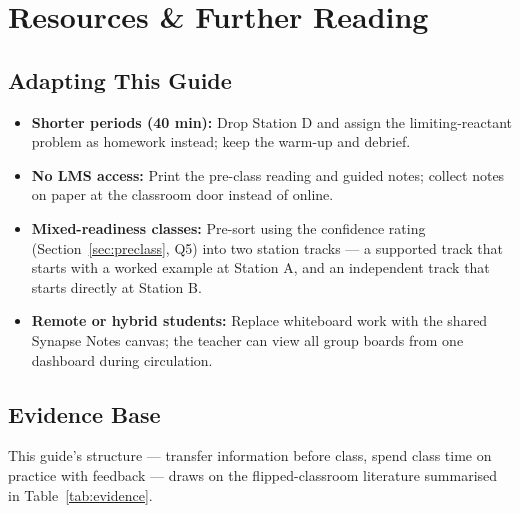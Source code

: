 \section{Resources \& Further Reading}

\subsection*{Adapting This Guide}

\begin{itemize}[label=\textbullet]
  \item \textbf{Shorter periods (40 min):} Drop Station D and assign the limiting-reactant problem as homework instead; keep the warm-up and debrief.
  \item \textbf{No LMS access:} Print the pre-class reading and guided notes; collect notes on paper at the classroom door instead of online.
  \item \textbf{Mixed-readiness classes:} Pre-sort using the confidence rating (Section~\ref{sec:preclass}, Q5) into two station tracks --- a supported track that starts with a worked example at Station A, and an independent track that starts directly at Station B.
  \item \textbf{Remote or hybrid students:} Replace whiteboard work with the shared Synapse Notes canvas; the teacher can view all group boards from one dashboard during circulation.
\end{itemize}

\subsection*{Evidence Base}

This guide's structure --- transfer information before class, spend
class time on practice with feedback --- draws on the flipped-classroom
literature summarised in Table~\ref{tab:evidence}.

